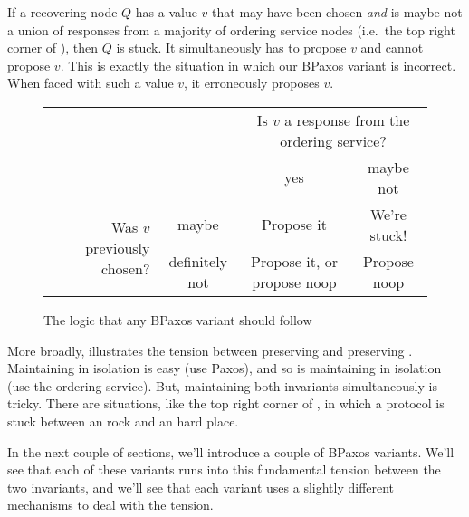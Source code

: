 If a recovering node $Q$ has a value $v$ that may have been chosen \emph{and}
is maybe not a union of responses from a majority of ordering service nodes
(i.e.\ the top right corner of ), then $Q$ is stuck. It
simultaneously has to propose $v$ and cannot propose $v$. This is exactly the
situation in which our BPaxos variant is incorrect. When faced with such a
value $v$, it erroneously proposes $v$.

\begin{figure}[h]
  \centering
  \begin{tabular}{rccc}
    &
    &
    \multicolumn{2}{p{3in}}{%
      Is $v$ a response from the ordering service?
    } \\
    &
    &
    yes &
    maybe not \\\cline{3-4}
    \multirow{2}{1.8in}{Was $v$ previously chosen?} &
    maybe &
    \multicolumn{1}{|c|}{Propose it} &
    \multicolumn{1}{|c|}{We're stuck!} \\\cline{3-4}
    &
    definitely not &
    \multicolumn{1}{|c|}{Propose it, or propose noop} &
    \multicolumn{1}{|c|}{Propose noop} \\\cline{3-4}
  \end{tabular}
  \caption{The logic that any BPaxos variant should follow}%
\end{figure}

More broadly,  illustrates the tension between preserving
 and preserving . Maintaining
 in isolation is easy (use Paxos), and so is maintaining
 in isolation (use the ordering service). But,
maintaining both invariants simultaneously is tricky. There are situations,
like the top right corner of , in which a protocol is stuck
between an  rock and an  hard
place.

In the next couple of sections, we'll introduce a couple of BPaxos variants.
We'll see that each of these variants runs into this fundamental tension
between the two invariants, and we'll see that each variant uses a slightly
different mechanisms to deal with the tension.
